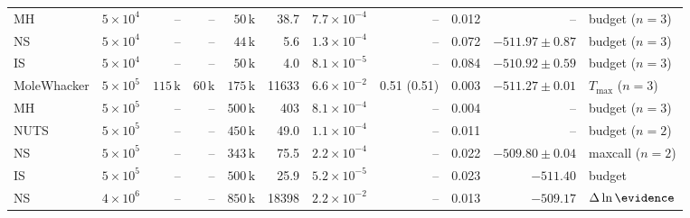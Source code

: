\begin{tabular}{@{}llrrrrrrrrl@{}}
  MH & \(5 \times 10^{4}\) & -- & -- & \(50\,\mathrm{k}\) & 38.7 & \(7.7 \times 10^{-4}\) & -- & 0.012 & -- & budget (\(n=3\)) \\
  NS & \(5 \times 10^{4}\) & -- & -- & \(44\,\mathrm{k}\) & 5.6 & \(1.3 \times 10^{-4}\) & -- & 0.072 & \(-511.97 \pm 0.87\) & budget (\(n=3\)) \\
  IS & \(5 \times 10^{4}\) & -- & -- & \(50\,\mathrm{k}\) & 4.0 & \(8.1 \times 10^{-5}\) & -- & 0.084 & \(-510.92 \pm 0.59\) & budget (\(n=3\)) \\
  MoleWhacker & \(5 \times 10^{5}\) & \(115\,\mathrm{k}\) & \(60\,\mathrm{k}\) & \(175\,\mathrm{k}\) & 11633 & \(6.6 \times 10^{-2}\) & 0.51 (0.51) & 0.003 & \(-511.27 \pm 0.01\) & \(T_{\max}\) (\(n=3\)) \\
  MH & \(5 \times 10^{5}\) & -- & -- & \(500\,\mathrm{k}\) & 403 & \(8.1 \times 10^{-4}\) & -- & 0.004 & -- & budget (\(n=3\)) \\
  NUTS & \(5 \times 10^{5}\) & -- & -- & \(450\,\mathrm{k}\) & 49.0 & \(1.1 \times 10^{-4}\) & -- & 0.011 & -- & budget (\(n=2\)) \\
  NS & \(5 \times 10^{5}\) & -- & -- & \(343\,\mathrm{k}\) & 75.5 & \(2.2 \times 10^{-4}\) & -- & 0.022 & \(-509.80 \pm 0.04\) & maxcall (\(n=2\)) \\
  IS & \(5 \times 10^{5}\) & -- & -- & \(500\,\mathrm{k}\) & 25.9 & \(5.2 \times 10^{-5}\) & -- & 0.023 & \(-511.40\) & budget \\
  NS & \(4 \times 10^{6}\) & -- & -- & \(850\,\mathrm{k}\) & 18398 & \(2.2 \times 10^{-2}\) & -- & 0.013 & \(-509.17\) & \(\Delta\ln\evidence\) \\
  \bottomrule
\end{tabular}
